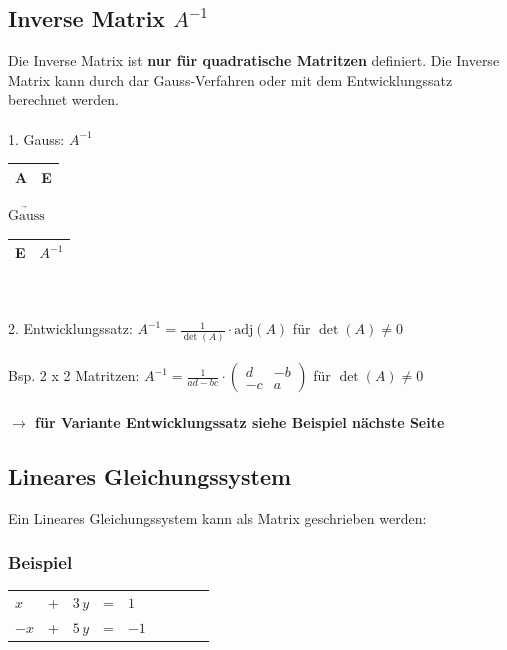 		    \subsection{Inverse Matrix $A^{-1}$}
		    Die Inverse Matrix ist \textbf{nur für quadratische Matritzen} definiert.
		    Die Inverse Matrix kann durch dar Gauss-Verfahren oder mit dem Entwicklungssatz berechnet werden. \\
		    \\
		    1. Gauss: \quad $A^{-1}$ \quad \begin{tabular}{|c|c|}
		    					\hline
		    					A & E \\
		    					\hline
		    					\end{tabular} \quad $\underrightarrow{\text{Gauss}}$ \quad \begin{tabular}{|c|c|}
		    					\hline
		    					E & $A^{-1}$ \\
		    					\hline
		    					\end{tabular} \\
					\\
			2. Entwicklungssatz: \quad $A^{-1} = \frac{1}{\det(A)} \cdot \mathrm{adj}(A) $  für $\det(A) \neq 0$ \\
			\\
			Bsp. 2 x 2 Matritzen: \quad $A^{-1} = \frac{1}{ad-bc} \cdot \begin{pmatrix}
			d & -b \\
			-c & a 
			\end{pmatrix} $  für $\det(A) \neq 0$ \\
			\\
			\textbf{$\rightarrow$ für Variante Entwicklungssatz siehe Beispiel nächste Seite} \\
			

			\subsection{Lineares Gleichungssystem }
			 Ein Lineares Gleichungssystem kann als Matrix geschrieben werden:
			 
			 \subsubsection{Beispiel}
			 \begin{tabular}{llllll |c c | c|}
			 $x$ & + & $3 \, y$ & = & $1$  \\
			 $-x$ & + & $5 \, y$ & = & $-1$  \\
			 \end{tabular} 
			\\
			 
